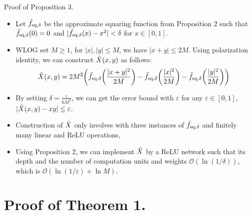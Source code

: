 \documentclass{if-beamer}
\begin{document}
\begin{frame}{Proof of Proposition 3.}
\begin{itemize}
    \item Let $\Tilde{f}_{\text{sq},\delta}$ be the approximate squaring function from Proposition 2 such that $\Tilde{f}_{\text{sq},\delta}(0)=0$ and $|\Tilde{f}_{\text{sq},\delta}(x)-x^{2}|<\delta$ for $x\in[0,1]$.
    \item WLOG set $M\geq 1$, for $|x|,|y|\leq M$, we have $|x+y|\leq 2M$. Using polarization identity, we can construct $\Tilde{X}(x,y)$ as follows:
    \begin{align*}
        \Tilde{X}(x,y) = 2M^{2}\bigg(\Tilde{f}_{\text{sq},\delta}\bigg(\frac{|x+y|^{2}}{2M}\bigg)
        - \Tilde{f}_{\text{sq},\delta}\bigg(\frac{|x|^{2}}{2M}\bigg) - \Tilde{f}_{\text{sq},\delta}\bigg(\frac{|y|^{2}}{2M}\bigg) \bigg)
    \end{align*}
    \item By setting $\delta = \frac{\varepsilon}{6M^{2}}$, we can get the error bound with $\varepsilon$ for any $\varepsilon\in [0,1]$, $|\Tilde{X}(x,y)-xy|\leq\varepsilon$.
    \item Construction of $\Tilde{X}$ only involves with three instances of $\Tilde{f}_{\text{sq},\delta}$ and finitely many linear and ReLU operations,
    \item Using Proposition 2, we can implement $\Tilde{X}$ by a ReLU network such that its depth and the number of computation units and weights $\mathcal{O}(\ln(1/\delta))$, which is $\mathcal{O}(\ln(1/\varepsilon)+\ln M)$.
\end{itemize}

\end{frame}

\section{Proof of Theorem 1.}
\end{document}

